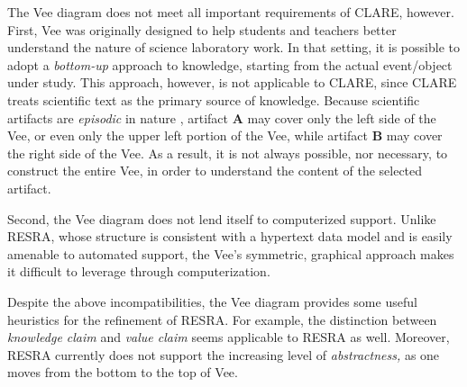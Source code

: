 The Vee diagram does not meet all important requirements of CLARE, however.
First, Vee was originally designed to help students and teachers better
understand the nature of science laboratory work. In that setting, it is
possible to adopt a {\it bottom-up\/} approach to knowledge, starting from
the actual event/object under study. This approach, however, is not
applicable to CLARE, since CLARE treats scientific text as the primary
source of knowledge.  Because scientific artifacts are {\it episodic\/} in
nature \cite{Swaminathan90}, artifact {\bf A} may cover only the left side
of the Vee, or even only the upper left portion of the Vee, while artifact
{\bf B} may cover the right side of the Vee. As a result, it is not always
possible, nor necessary, to construct the entire Vee, in order to
understand the content of the selected artifact.

Second, the Vee diagram does not lend itself to computerized support.
Unlike RESRA, whose structure is consistent with a hypertext data model and
is easily amenable to automated support, the Vee's symmetric, graphical
approach makes it difficult to leverage through computerization.

Despite the above incompatibilities, the Vee diagram provides some useful
heuristics for the refinement of RESRA. For example, the distinction
between {\it knowledge claim\/} and {\it value claim\/} seems applicable to
RESRA as well. Moreover, RESRA currently does not support the increasing
level of {\it abstractness,\/} as one moves from the bottom to the top of
Vee. 


